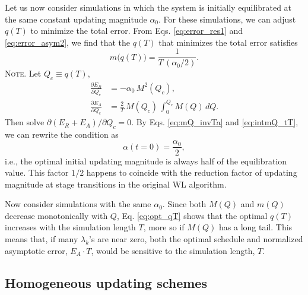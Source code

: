 \documentclass[reprint, floatfix]{revtex4-1}
\newcommand{\note}[1]{{\color{DarkGreen}\footnotesize \textsc{Note.} #1}}
\begin{document}
Let us now consider simulations in which
the system is initially equilibrated at the same
constant updating magnitude $\alpha_0$.
%
For these simulations,
we can adjust $q(T)$
to minimize the total error.
%
From Eqs. \eqref{eq:error_res1}
and \eqref{eq:error_asym2},
we find that
the $q(T)$ that minimizes
the total error satisfies
\begin{equation}
  m\bigl( q(T) \bigr)
  =
  \frac{1} { T \, (\alpha_0 / 2) }
  .
\label{eq:opt_qT}
\end{equation}
%
\note{Let $Q_c \equiv q(T)$,
$$
\begin{aligned}
  \frac{
    \partial E_R
  }
  {
    \partial Q_c
  }
  &=
  -\alpha_0 \, M^2(Q_c)
  ,
  \\
  \frac{
    \partial E_A
  }
  {
    \partial Q_c
  }
  &=
  \frac 2 T \,
  M(Q_c) \,
  \int_0^{ Q_c } M(Q) \, dQ
  .
\end{aligned}
$$
Then solve $\partial (E_R + E_A) / \partial Q_c = 0$.
}%
By Eqs. \eqref{eq:mQ_invTa} and \eqref{eq:intmQ_tT},
we can rewrite the condition as
\begin{equation}
  \alpha( t = 0 )
  =
  \frac{ \alpha_0 }
       { 2 }
  ,
\label{eq:half_alpha0}
\end{equation}
%
i.e., the optimal initial updating magnitude
is always half of the equilibration value.
%
This factor $1/2$
happens to coincide with the
reduction factor of updating magnitude
at stage transitions
in the original WL algorithm\cite{
wang2001, wang2001pre}.


Now consider
simulations with the same $\alpha_0$.
%
Since both $M(Q)$ and $m(Q)$ decrease monotonically with $Q$,
Eq. \eqref{eq:opt_qT} shows that
the optimal $q(T)$ increases with
the simulation length $T$,
more so if $M(Q)$ has a long tail.
%
This means that, if many $\lambda_k$'s are near zero,
both the optimal schedule and
normalized asymptotic error, $E_A \cdot T$,
would be sensitive to the simulation length, $T$.
%




\subsection{\label{sec:band-matrix}
Homogeneous updating schemes}
\end{document}
